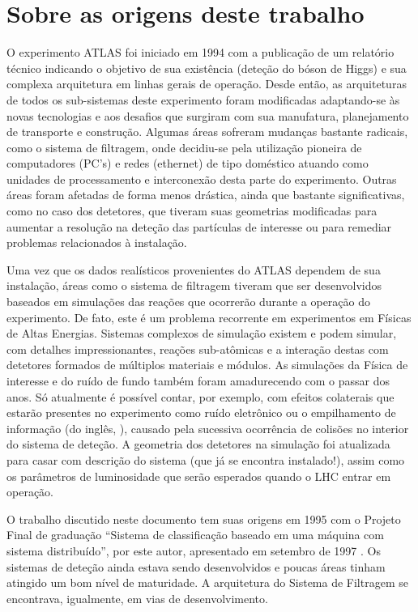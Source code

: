 \section{Sobre as origens deste trabalho}

O experimento ATLAS foi iniciado em 1994 com a publicação de um relatório
técnico indicando o objetivo de sua existência (deteção do bóson de Higgs) e
sua complexa arquitetura em linhas gerais de operação. Desde então, as
arquiteturas de todos os sub-sistemas deste experimento foram modificadas
adaptando-se às novas tecnologias e aos desafios que surgiram com sua
manufatura, planejamento de transporte e construção. Algumas áreas sofreram
mudanças bastante radicais, como o sistema de filtragem, onde decidiu-se pela
utilização pioneira de computadores (PC's) e redes (ethernet) de tipo
doméstico atuando como unidades de processamento e interconexão desta parte do
experimento. Outras áreas foram afetadas de forma menos drástica, ainda que
bastante significativas, como no caso dos detetores, que tiveram suas
geometrias modificadas para aumentar a resolução na deteção das partículas de
interesse ou para remediar problemas relacionados à instalação.

Uma vez que os dados realísticos provenientes do ATLAS dependem de sua
instalação, áreas como o sistema de filtragem tiveram que ser desenvolvidos
baseados em simulações das reações que ocorrerão durante a operação do
experimento. De fato, este é um problema recorrente em experimentos em Físicas
de Altas Energias. Sistemas complexos de simulação existem e podem simular,
com detalhes impressionantes, reações sub-atômicas e a interação destas com
detetores formados de múltiplos materiais e módulos. As simulações da Física
de interesse e do ruído de fundo também foram amadurecendo com o passar dos
anos. Só atualmente é possível contar, por exemplo, com efeitos colaterais que
estarão presentes no experimento como ruído eletrônico ou o empilhamento de
informação (do inglês, ), causado pela sucessiva ocorrência de
colisões no interior do sistema de deteção. A geometria dos detetores na
simulação foi atualizada para casar com descrição do sistema (que já se
encontra instalado!), assim como os parâmetros de luminosidade que serão
esperados quando o LHC entrar em operação.

O trabalho discutido neste documento tem suas origens em 1995 com o Projeto
Final de graduação ``Sistema de classificação baseado em uma máquina com
sistema distribuído'', por este autor, apresentado em setembro de 1997
\cite{aa:projeto-final}. Os sistemas de deteção ainda estava sendo
desenvolvidos e poucas áreas tinham atingido um bom nível de maturidade. A
arquitetura do Sistema de Filtragem se encontrava, igualmente, em vias de
desenvolvimento.

